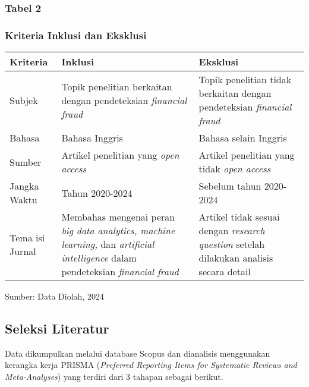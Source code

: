 \documentclass[12pt, a4paper]{article}
\begin{document}
\begin{center}
    \renewcommand{\arraystretch}{1.5} %
    \subsubsection*{Tabel 2}
    \subsubsection*{Kriteria Inklusi dan Eksklusi}
    \begin{longtable}{|p{2cm}|p{4cm}|p{4cm}|}
        \hline
        \textbf{Kriteria} & \textbf{Inklusi} & \textbf{Eksklusi} \\ 
        \hline
        Subjek & 
        Topik penelitian berkaitan dengan pendeteksian \textit{financial fraud} & 
        Topik penelitian tidak berkaitan dengan pendeteksian \textit{financial fraud} \\ 
        \hline
        Bahasa &
        Bahasa Inggris &
        Bahasa selain Inggris \\
        \hline
        Sumber &
        Artikel penelitian yang \textit{open access} &
        Artikel penelitian yang tidak \textit{open access} \\
        \hline
        Jangka Waktu &
        Tahun 2020-2024 &
        Sebelum tahun 2020-2024 \\
        \hline
        Tema isi Jurnal &
        Membahas mengenai peran \textit{big data analytics, machine learning,} dan \textit{artificial intelligence} dalam pendeteksian \textit{financial fraud} &
        Artikel tidak sesuai dengan \textit{research question} setelah dilakukan analisis secara detail \\
        \hline
    \end{longtable}
\end{center}

\begin{flushleft}
Sumber: Data Diolah, 2024
\end{flushleft}

\subsection*{Seleksi Literatur}
\hspace{1cm}Data dikumpulkan melalui database Scopus dan dianalisis menggunakan kerangka kerja PRISMA
(\textit{Preferred Reporting Items for Systematic Reviews and Meta-Analyses}) yang terdiri dari 3 tahapan sebagai berikut.
\end{document}
